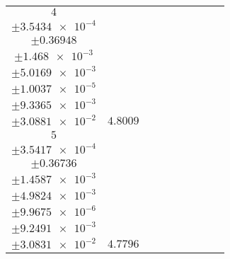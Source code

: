 \documentclass[8pt]{article}
\begin{document}
\begin{longtable}[l]{c c c c c c c c c}
$\num{4}$ & \begin{tabular}[c]{@{}c@{}}$\num{5.5378e-2}$ \\ $\pm\num{3.5434e-4}$\end{tabular} & \begin{tabular}[c]{@{}c@{}}$\num{0.67952}$ \\ $\pm\num{0.36948}$\end{tabular} & \begin{tabular}[c]{@{}c@{}}$\num{9.9652}$ \\ $\pm\num{1.468e-3}$\end{tabular} & \begin{tabular}[c]{@{}c@{}}$\num{2.0414e+3}$ \\ $\pm\num{5.0169e-3}$\end{tabular} & \begin{tabular}[c]{@{}c@{}}$\num{4.084}$ \\ $\pm\num{1.0037e-5}$\end{tabular} & \begin{tabular}[c]{@{}c@{}}$\num{1.1941}$ \\ $\pm\num{9.3365e-3}$\end{tabular} & \begin{tabular}[c]{@{}c@{}}$\num{4.1899}$ \\ $\pm\num{3.0881e-2}$\end{tabular} & $\num{4.8009}$\\
$\num{5}$ & \begin{tabular}[c]{@{}c@{}}$\num{5.5565e-2}$ \\ $\pm\num{3.5417e-4}$\end{tabular} & \begin{tabular}[c]{@{}c@{}}$\num{-1.0022}$ \\ $\pm\num{0.36736}$\end{tabular} & \begin{tabular}[c]{@{}c@{}}$\num{-10.382}$ \\ $\pm\num{1.4587e-3}$\end{tabular} & \begin{tabular}[c]{@{}c@{}}$\num{2.0643e+3}$ \\ $\pm\num{4.9824e-3}$\end{tabular} & \begin{tabular}[c]{@{}c@{}}$\num{4.1298}$ \\ $\pm\num{9.9675e-6}$\end{tabular} & \begin{tabular}[c]{@{}c@{}}$\num{1.1897}$ \\ $\pm\num{9.2491e-3}$\end{tabular} & \begin{tabular}[c]{@{}c@{}}$\num{4.1923}$ \\ $\pm\num{3.0831e-2}$\end{tabular} & $\num{4.7796}$\\

\end{longtable}
\end{document}
